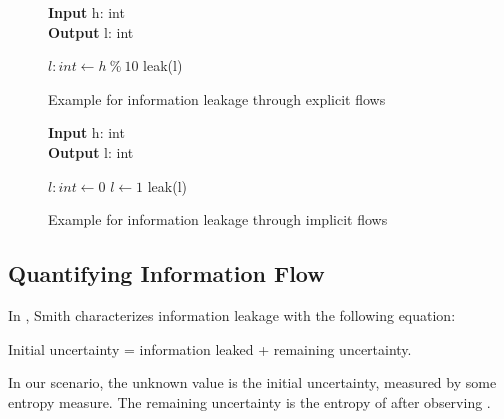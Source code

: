 \begin{figure}
    \centering
    \begin{minipage}{.7\linewidth}
        \begin{algorithm}[H]
            \hspace*{\algorithmicindent} \textbf{Input} h: int \\
            \hspace*{\algorithmicindent} \textbf{Output} l: int
            \hspace*{1em}
            \begin{algorithmic}[1]
                \State $l: int \leftarrow h \: \% \: 10$
                \State leak(l)
            \end{algorithmic} 
        \end{algorithm}
\end{minipage}
\caption{Example for information leakage through explicit flows}
\label{fig:exEx}
\end{figure}

\begin{figure}
    \centering
    \begin{minipage}{.7\linewidth}
        \begin{algorithm}[H]
            \hspace*{\algorithmicindent} \textbf{Input} h: int \\
            \hspace*{\algorithmicindent} \textbf{Output} l: int
            \hspace*{1em}
            \begin{algorithmic}[1]
                \State $l: int \leftarrow 0$
                \State $l \leftarrow 1$
                \EndIf
                \State leak(l)
            \end{algorithmic} 
        \end{algorithm}
\end{minipage}
\caption{Example for information leakage through implicit flows}
\label{fig:ifEx}
\end{figure}

\subsection{Quantifying Information Flow}

In \cite{smith09}, Smith characterizes information leakage with the following equation:
\begin{center}
    Initial uncertainty = information leaked + remaining uncertainty.
\end{center}
In our scenario, the unknown value \In is the initial uncertainty, measured by some entropy measure. The remaining uncertainty is the entropy of \In after observing \Out. 

